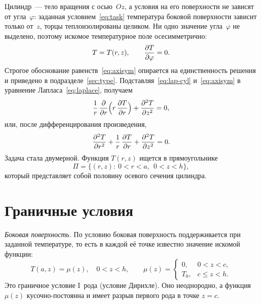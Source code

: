 Цилиндр~— тело вращения с осью~$Oz$, а условия на его поверхности не
зависят от угла~$\varphi$: заданная условием~\eqref{eq:task} температура
боковой поверхности зависит только от~$z$, торцы теплоизолированы целиком.
Ни одно значение угла~$\varphi$ не выделено, поэтому искомое температурное
поле осесимметрично:
\begin{equation}
\label{eq:axisym}
T=T(r,z),\qquad \dfrac{\partial T}{\partial \varphi}=0 .
\end{equation}
Строгое обоснование равенств~\eqref{eq:axisym} опирается на единственность
решения и приведено в подразделе~\ref{sec:type}.
Подставляя~\eqref{eq:lap-cyl} и~\eqref{eq:axisym} в уравнение
Лапласа~\eqref{eq:laplace}, получаем
\begin{equation}
\label{eq:main-div}
\frac{1}{r}\,\dfrac{\partial }{\partial r}\Bigl(r\,\dfrac{\partial T}{\partial r}\Bigr)+\dfrac{\partial^2 T}{\partial z^2}=0,
\end{equation}
или, после дифференцирования произведения,
\begin{equation}
\label{eq:main}
\dfrac{\partial^2 T}{\partial r^2}+\frac{1}{r}\,\dfrac{\partial T}{\partial r}+\dfrac{\partial^2 T}{\partial z^2}=0 .
\end{equation}
Задача стала двумерной. Функция $T(r,z)$ ищется в прямоугольнике
\begin{equation}
\label{eq:Pi}
\Pi=\bigl\{(r,z):\ 0<r<a,\ \ 0<z<h\bigr\},
\end{equation}
который представляет собой половину осевого сечения цилиндра.

\section{Граничные условия}
\label{sec:bc}

\emph{Боковая поверхность.} По условию боковая поверхность поддерживается
при заданной температуре, то есть в каждой её точке известно значение
искомой функции:
\begin{equation}
\label{eq:bc-side}
T(a,z)=\mu(z),\quad 0<z<h,
\qquad
\mu(z)=
\begin{cases}
0,   & 0<z<c,\\[2pt]
T_0, & c\le z<h .
\end{cases}
\end{equation}
Это граничное условие I~рода (условие Дирихле). Оно неоднородно, а функция
$\mu(z)$ кусочно-постоянна и имеет разрыв первого рода в точке $z=c$.


